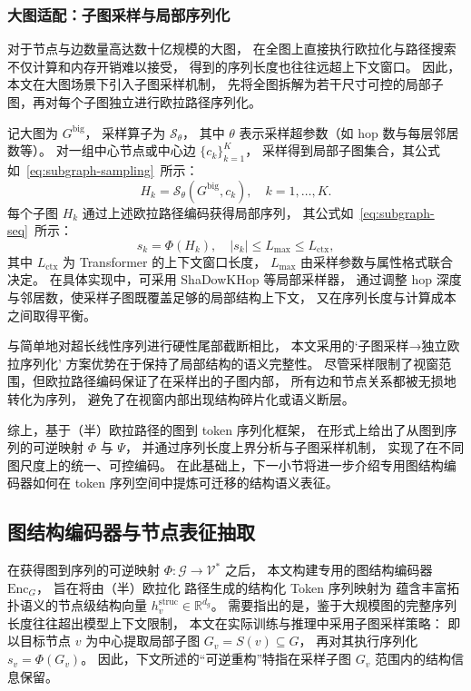 \subsubsection{大图适配：子图采样与局部序列化}

对于节点与边数量高达数十亿规模的大图，
在全图上直接执行欧拉化与路径搜索不仅计算和内存开销难以接受，
得到的序列长度也往往远超上下文窗口。
因此，本文在大图场景下引入子图采样机制，
先将全图拆解为若干尺寸可控的局部子图，再对每个子图独立进行欧拉路径序列化。

记大图为 \(G^{\mathrm{big}}\)，
采样算子为
\(
\mathcal{S}_\theta
\)，
其中 \(\theta\) 表示采样超参数（如 hop 数与每层邻居数等）。
对一组中心节点或中心边 \(\{c_k\}_{k=1}^K\)，
采样得到局部子图集合，其公式如~\ref{eq:subgraph-sampling}\ 所示：
\begin{equation}
    H_k = \mathcal{S}_\theta(G^{\mathrm{big}}, c_k),
    \quad k = 1, \dots, K.
    \label{eq:subgraph-sampling}
\end{equation}
每个子图 \(H_k\) 通过上述欧拉路径编码获得局部序列，
其公式如~\ref{eq:subgraph-seq}\ 所示：
\begin{equation}
    s_k = \Phi(H_k),
    \quad |s_k| \leq L_{\max} \leq L_{\mathrm{ctx}},
    \label{eq:subgraph-seq}
\end{equation}
其中 \(L_{\mathrm{ctx}}\) 为 Transformer 的上下文窗口长度，
\(L_{\max}\) 由采样参数与属性格式联合决定。
在具体实现中，可采用 ShaDowKHop 等局部采样器，
通过调整 hop 深度与邻居数，使采样子图既覆盖足够的局部结构上下文，
又在序列长度与计算成本之间取得平衡。

与简单地对超长线性序列进行硬性尾部截断相比，
本文采用的‘子图采样→独立欧拉序列化’
方案优势在于保持了局部结构的语义完整性。
尽管采样限制了视窗范围，但欧拉路径编码保证了在采样出的子图内部，
所有边和节点关系都被无损地转化为序列，
避免了在视窗内部出现结构碎片化或语义断层。

综上，基于（半）欧拉路径的图到 token 序列化框架，
在形式上给出了从图到序列的可逆映射 \(\Phi\) 与 \(\Psi\)，
并通过序列长度上界分析与子图采样机制，
实现了在不同图尺度上的统一、可控编码。
在此基础上，下一小节将进一步介绍专用图结构编码器如何在 token 序列空间中提炼可迁移的结构语义表征。

\subsection{图结构编码器与节点表征抽取}

在获得图到序列的可逆映射 $\Phi:\mathcal{G}\rightarrow\mathcal{V}^\ast$ 之后，
本文构建专用的图结构编码器 $\mathrm{Enc}_G$，
旨在将由（半）欧拉化 路径生成的结构化 Token 序列映射为
蕴含丰富拓扑语义的节点级结构向量 $h_v^{\mathrm{struc}}\in\mathbb{R}^{d_g}$。
需要指出的是，鉴于大规模图的完整序列长度往往超出模型上下文限制，
本文在实际训练与推理中采用子图采样策略：
即以目标节点 $v$ 为中心提取局部子图 $G_v=S(v)\subseteq G$，
再对其执行序列化 $s_v=\Phi(G_v)$。
因此，下文所述的“可逆重构”特指在采样子图 $G_v$ 范围内的结构信息保留。


